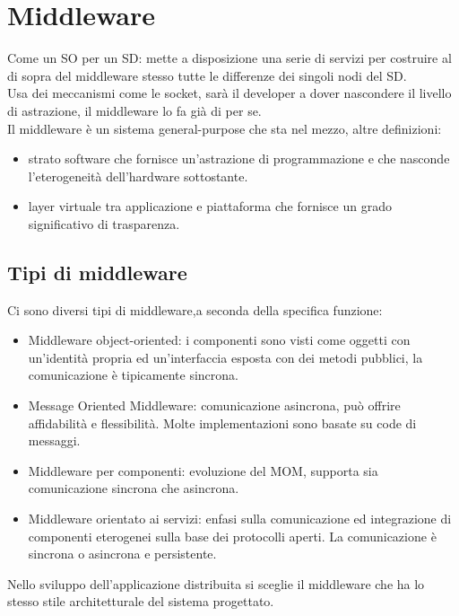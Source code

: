 \documentclass[16px]{article}
\begin{document}
\section{Middleware}
Come un SO per un SD: mette a disposizione una serie di servizi per costruire al di sopra del middleware stesso tutte le differenze dei singoli nodi del SD.\\ Usa dei meccanismi come le socket, sarà il developer a dover nascondere il livello di astrazione, il middleware lo fa già di per se.\\ Il middleware è un sistema general-purpose che sta nel mezzo, altre definizioni:
\begin{itemize}
\item strato software che fornisce un'astrazione di programmazione e che nasconde l'eterogeneità dell'hardware sottostante.
\item layer virtuale tra applicazione e piattaforma che fornisce un grado significativo di trasparenza.
\end{itemize}
\subsection{Tipi di middleware}
Ci sono diversi tipi di middleware,a seconda della specifica funzione:
\begin{itemize}
\item Middleware object-oriented: i componenti sono visti come oggetti con un'identità propria ed un'interfaccia esposta con dei metodi pubblici, la comunicazione è tipicamente sincrona.
\item Message Oriented Middleware: comunicazione asincrona, può offrire affidabilità e flessibilità. Molte implementazioni sono basate su code di messaggi.
\item Middleware per componenti: evoluzione del MOM, supporta sia comunicazione sincrona che asincrona.
\item Middleware orientato ai servizi: enfasi sulla comunicazione ed integrazione di componenti eterogenei sulla base dei protocolli aperti. La comunicazione è sincrona o asincrona e persistente.
\end{itemize}
Nello sviluppo dell'applicazione distribuita si sceglie il middleware che ha lo stesso stile architetturale del sistema progettato.
\end{document}
